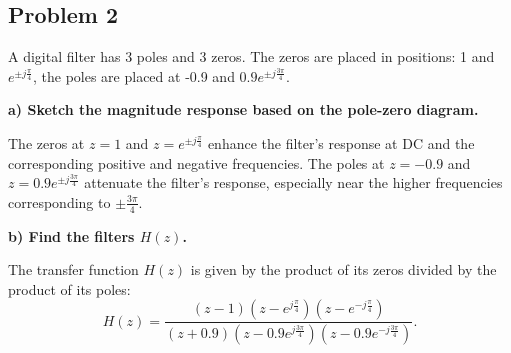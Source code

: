\documentclass{article}
\begin{document}
\subsection*{Problem 2}
A digital filter has 3 poles and 3 zeros. The zeros are placed in positions: 1 and \( e^{\pm j\frac{\pi}{4}} \), the poles are placed at -0.9 and \( 0.9e^{\pm j\frac{3\pi}{4}} \).

\textbf{a) Sketch the magnitude response based on the pole-zero diagram.}

The zeros at \(z = 1\) and \(z = e^{\pm j\frac{\pi}{4}}\) enhance the filter's response at DC and the corresponding positive and negative frequencies. The poles at \(z = -0.9\) and \(z = 0.9e^{\pm j\frac{3\pi}{4}}\) attenuate the filter's response, especially near the higher frequencies corresponding to \(\pm\frac{3\pi}{4}\).

\begin{center}
\end{center}

\textbf{b) Find the filters \( H(z) \).}

The transfer function \( H(z) \) is given by the product of its zeros divided by the product of its poles:
\[
    H(z) = \frac{(z - 1)(z - e^{j\frac{\pi}{4}})(z - e^{-j\frac{\pi}{4}})}{(z + 0.9)(z - 0.9e^{j\frac{3\pi}{4}})(z - 0.9e^{-j\frac{3\pi}{4}})}.
\]
\end{document}
